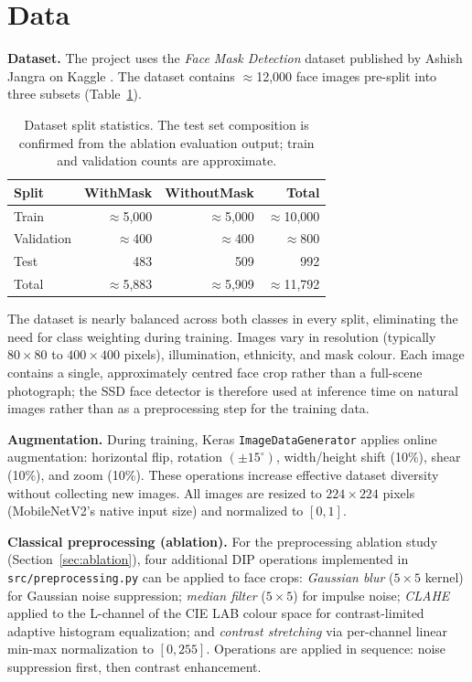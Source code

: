 \documentclass[11pt,a4paper]{article}
\begin{document}
\section{Data}

\textbf{Dataset.}
The project uses the \textit{Face Mask Detection} dataset published by Ashish
Jangra on Kaggle \cite{jangra2020}.
The dataset contains $\approx$12,000 face images pre-split into three subsets
(Table~\ref{tab:data}).

\begin{table}[H]
\centering
\caption{Dataset split statistics. The test set composition is confirmed from
the ablation evaluation output; train and validation counts are approximate.}
\label{tab:data}
\begin{tabular}{lrrr}
\toprule
Split & WithMask & WithoutMask & Total \\
\midrule
Train      & $\approx$5,000 & $\approx$5,000 & $\approx$10,000 \\
Validation & $\approx$400   & $\approx$400   & $\approx$800    \\
Test       & 483            & 509            & 992             \\
\midrule
Total      & $\approx$5,883 & $\approx$5,909 & $\approx$11,792 \\
\bottomrule
\end{tabular}
\end{table}

The dataset is nearly balanced across both classes in every split, eliminating the
need for class weighting during training.
Images vary in resolution (typically $80{\times}80$ to $400{\times}400$ pixels),
illumination, ethnicity, and mask colour.
Each image contains a single, approximately centred face crop rather than a
full-scene photograph; the SSD face detector is therefore used at inference time
on natural images rather than as a preprocessing step for the training data.

\textbf{Augmentation.}
During training, Keras \texttt{ImageDataGenerator} applies online augmentation:
horizontal flip, rotation $(\pm15^\circ)$, width/height shift (10\%), shear
(10\%), and zoom (10\%).
These operations increase effective dataset diversity without collecting new images.
All images are resized to $224{\times}224$ pixels (MobileNetV2's native input
size) and normalized to $[0, 1]$.

\textbf{Classical preprocessing (ablation).}
For the preprocessing ablation study (Section~\ref{sec:ablation}), four
additional DIP operations implemented in \texttt{src/preprocessing.py} can be
applied to face crops:
\textit{Gaussian blur} ($5{\times}5$ kernel) for Gaussian noise suppression;
\textit{median filter} ($5{\times}5$) for impulse noise;
\textit{CLAHE} applied to the L-channel of the CIE LAB colour space for
contrast-limited adaptive histogram equalization;
and \textit{contrast stretching} via per-channel linear min-max normalization to
$[0, 255]$.
Operations are applied in sequence: noise suppression first, then contrast
enhancement.
\end{document}
